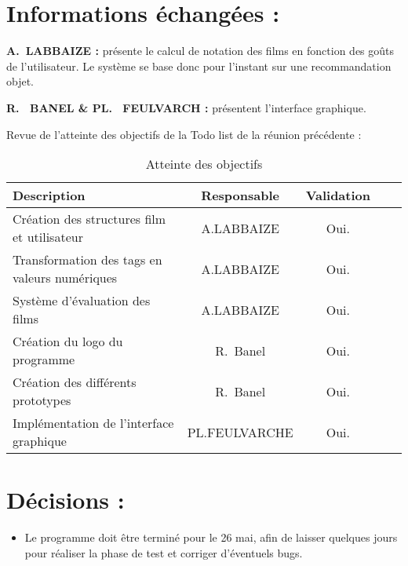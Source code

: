 \documentclass[11pt]{meetingmins}
\begin{document}
\section{Informations échangées :}
\begin{hiddenitems}
\item
\textbf{A.~LABBAIZE : } présente le calcul de notation des films en fonction des goûts de l'utilisateur. Le système se base donc pour l'instant sur une recommandation objet.

\item
\textbf{R. ~BANEL & PL. ~FEULVARCH : } présentent l'interface graphique.


\item Revue de l'atteinte des objectifs de la Todo list de la réunion précédente :
\begin{table}[h]
    \centering
    \begin{tabular}{|p{4cm}|c|c|c|c|}
    \hline
        \rowcolor{yellow} Description & Responsable & Validation
        \tabularnewline \hline
        Création des structures film et utilisateur &  A.LABBAIZE & Oui.
        \tabularnewline \hline
        Transformation des tags en valeurs numériques & A.LABBAIZE & Oui.
        \tabularnewline \hline
        Système d'évaluation des films & A.LABBAIZE & Oui.
        \tabularnewline \hline
        Création du logo du programme  & R.~Banel & Oui. 
        \tabularnewline \hline
        Création des différents prototypes & R.~Banel & Oui. 
        \tabularnewline \hline
        Implémentation de l'interface graphique  & PL.FEULVARCHE& Oui. 
        \tabularnewline \hline 

        
    \end{tabular}
    \caption{Atteinte des objectifs}
    \label{tab:my_label}
\end{table}

\end{hiddenitems}

\newpage

\section{Décisions :}
\begin{itemize}
    \item Le programme doit être terminé pour le 26 mai, afin de laisser quelques jours pour réaliser la phase de test et corriger d'éventuels bugs.
\end{itemize}
        
\end{document}
